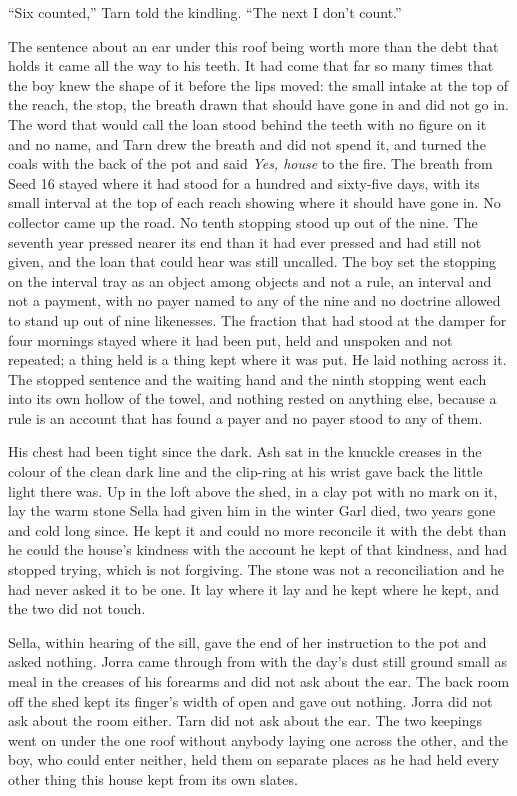 “Six counted,” Tarn told the kindling. “The next I don't count.”

The sentence about an ear under this roof being worth more than the debt that holds it came all the way to his teeth. It had come that far so many times that the boy knew the shape of it before the lips moved: the small intake at the top of the reach, the stop, the breath drawn that should have gone in and did not go in. The word that would call the loan stood behind the teeth with no figure on it and no name, and Tarn drew the breath and did not spend it, and turned the coals with the back of the pot and said \emph{Yes, house} to the fire. The breath from Seed 16 stayed where it had stood for a hundred and sixty-five days, with its small interval at the top of each reach showing where it should have gone in. No collector came up the road. No tenth stopping stood up out of the nine. The seventh year pressed nearer its end than it had ever pressed and had still not given, and the loan that could hear was still uncalled. The boy set the stopping on the interval tray as an object among objects and not a rule, an interval and not a payment, with no payer named to any of the nine and no doctrine allowed to stand up out of nine likenesses. The fraction that had stood at the damper for four mornings stayed where it had been put, held and unspoken and not repeated; a thing held is a thing kept where it was put. He laid nothing across it. The stopped sentence and the waiting hand and the ninth stopping went each into its own hollow of the towel, and nothing rested on anything else, because a rule is an account that has found a payer and no payer stood to any of them.

His chest had been tight since the dark. Ash sat in the knuckle creases in the colour of the clean dark line and the clip-ring at his wrist gave back the little light there was. Up in the loft above the shed, in a clay pot with no mark on it, lay the warm stone Sella had given him in the winter Garl died, two years gone and cold long since. He kept it and could no more reconcile it with the debt than he could the house's kindness with the account he kept of that kindness, and had stopped trying, which is not forgiving. The stone was not a reconciliation and he had never asked it to be one. It lay where it lay and he kept where he kept, and the two did not touch.

Sella, within hearing of the sill, gave the end of her instruction to the pot and asked nothing. Jorra came through from  with the day's dust still ground small as meal in the creases of his forearms and did not ask about the ear. The back room off the shed kept its finger's width of open and gave out nothing. Jorra did not ask about the room either. Tarn did not ask about the ear. The two keepings went on under the one roof without anybody laying one across the other, and the boy, who could enter neither, held them on separate places as he had held every other thing this house kept from its own slates.

